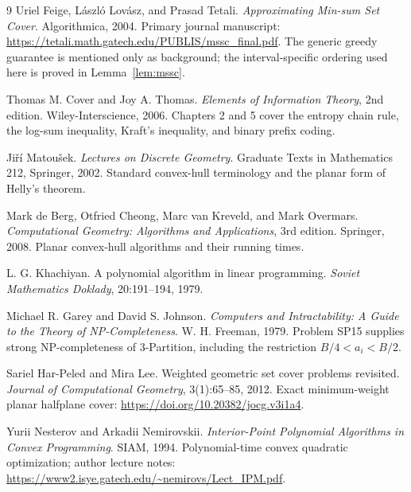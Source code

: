 \begingroup
\small
\begin{thebibliography}{9}
\setlength{\itemsep}{2pt}
Uriel Feige, L\'aszl\'o Lov\'asz, and Prasad Tetali.
\newblock \emph{Approximating Min-sum Set Cover}.
\newblock Algorithmica, 2004.
\newblock Primary journal manuscript:
\url{https://tetali.math.gatech.edu/PUBLIS/mssc_final.pdf}.
\newblock The generic greedy guarantee is mentioned only as
background; the interval-specific ordering used here is proved
in Lemma~\ref{lem:mssc}.

Thomas M. Cover and Joy A. Thomas.
\newblock \emph{Elements of Information Theory}, 2nd edition.
\newblock Wiley-Interscience, 2006.
\newblock Chapters 2 and 5 cover the entropy chain rule, the
log-sum inequality, Kraft's inequality, and binary prefix coding.

Ji\v{r}\'i Matou\v{s}ek.
\newblock \emph{Lectures on Discrete Geometry}.
\newblock Graduate Texts in Mathematics 212, Springer, 2002.
\newblock Standard convex-hull terminology and the planar form
of Helly's theorem.

Mark de Berg, Otfried Cheong, Marc van Kreveld, and Mark Overmars.
\newblock \emph{Computational Geometry: Algorithms and Applications},
3rd edition.
\newblock Springer, 2008.
\newblock Planar convex-hull algorithms and their running times.

L. G. Khachiyan.
\newblock A polynomial algorithm in linear programming.
\newblock \emph{Soviet Mathematics Doklady}, 20:191--194, 1979.

Michael R. Garey and David S. Johnson.
\newblock \emph{Computers and Intractability:
A Guide to the Theory of NP-Completeness}.
\newblock W. H. Freeman, 1979.
\newblock Problem SP15 supplies strong NP-completeness of 3-Partition,
including the restriction $B/4<a_i<B/2$.

Sariel Har-Peled and Mira Lee.
\newblock Weighted geometric set cover problems revisited.
\newblock \emph{Journal of Computational Geometry}, 3(1):65--85, 2012.
\newblock Exact minimum-weight planar halfplane cover:
\url{https://doi.org/10.20382/jocg.v3i1a4}.

Yurii Nesterov and Arkadii Nemirovskii.
\newblock \emph{Interior-Point Polynomial Algorithms in Convex Programming}.
\newblock SIAM, 1994.
\newblock Polynomial-time convex quadratic optimization; author lecture notes:
\url{https://www2.isye.gatech.edu/~nemirovs/Lect_IPM.pdf}.
\end{thebibliography}
\endgroup
